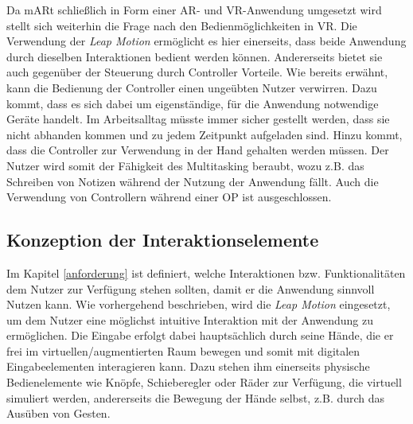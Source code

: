 Da mARt schließlich in Form einer AR- und VR-Anwendung umgesetzt wird stellt sich weiterhin die Frage nach den Bedienmöglichkeiten in VR. Die Verwendung der \textit{Leap Motion} ermöglicht es hier einerseits, dass beide Anwendung durch dieselben Interaktionen bedient werden können. Andererseits bietet sie auch gegenüber der Steuerung durch Controller Vorteile. 
Wie bereits erwähnt, kann die Bedienung der Controller einen ungeübten Nutzer verwirren. Dazu kommt, dass es sich dabei um eigenständige, für die Anwendung notwendige Geräte handelt. Im Arbeitsalltag müsste immer sicher gestellt werden, dass sie nicht abhanden kommen und zu jedem Zeitpunkt aufgeladen sind. 
Hinzu kommt, dass die Controller zur Verwendung in der Hand gehalten werden müssen. Der Nutzer wird somit der Fähigkeit des Multitasking beraubt, wozu z.B. das Schreiben von Notizen während der Nutzung der Anwendung fällt. Auch die Verwendung von Controllern während einer OP ist ausgeschlossen.

\subsection{Konzeption der Interaktionselemente}

Im Kapitel \ref{anforderung} ist definiert, welche Interaktionen bzw. Funktionalitäten dem Nutzer zur Verfügung stehen sollten, damit er die Anwendung sinnvoll Nutzen kann. 
Wie vorhergehend beschrieben, wird die \textit{Leap Motion} eingesetzt, um dem Nutzer eine möglichst intuitive Interaktion mit der Anwendung zu ermöglichen. Die Eingabe erfolgt dabei hauptsächlich durch seine Hände, die er frei im virtuellen/augmentierten Raum bewegen und somit mit digitalen Eingabeelementen interagieren kann. 
Dazu stehen ihm einerseits physische Bedienelemente wie Knöpfe, Schieberegler oder Räder zur Verfügung, die virtuell simuliert werden, andererseits die Bewegung der Hände selbst, z.B. durch das Ausüben von Gesten.

